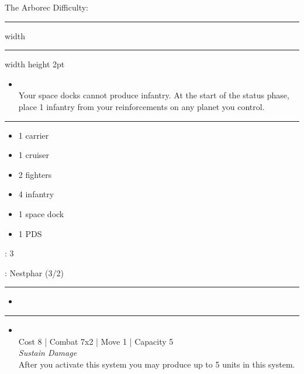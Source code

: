 {\handel \Huge The Arborec} \hfill {\Large Difficulty: \hard} \vspace{-4pt}\\
\hrule width \hsize \kern 1mm \hrule width \hsize height 2pt


\begin{multicols}{2}


\begin{itemize}
\item {}\\
Your space docks cannot produce infantry. At the start of the status phase, place 1 infantry from your reinforcements on any planet you control.
\end{itemize}


\vspace{-10pt}\rule{\hsize}{0.4pt}\vspace{5pt}


\vspace{-5pt}
\begin{multicols}{2}
\begin{itemize}
\item 1 carrier
\item 1 cruiser
\item 2 fighters
\item 4 infantry
\item 1 space dock
\item 1 PDS
\end{itemize}
\end{multicols}

\vspace{-5pt}
: 3

\vspace{2pt}
: Nestphar (3/2)

\rule{\hsize}{0.4pt}\vspace{5pt}


\begin{itemize}
\item \magen
\end{itemize}

\vspace{-10pt}\rule{\hsize}{0.4pt}\vspace{5pt}


\begin{itemize}
\item {}\\
Cost 8 | Combat 7x2 | Move 1 | Capacity 5 \\
\emph{Sustain Damage}\\
After you activate this system you may produce up to 5 units in this system.
\end{itemize}


\end{multicols}

